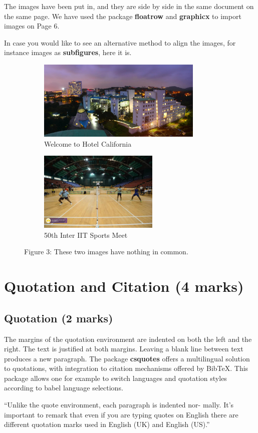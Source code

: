 \documentclass[english,12pt]{article}
\begin{document}
The images have been put in, and they are side by side in the same document
on the same page. We have used the package \textbf{floatrow} and \textbf{graphicx} to import
images on Page 6.\par
In case you would like to see an alternative method to align the images, for
instance images as \textbf{subfigures}, here it is.
\begin{figure}[H]
    \hspace{1cm}
    \begin{subfigure}{.4\textwidth}
        \includegraphics[width=\linewidth, height=1.5in]{3}
        \caption{\normalsize Welcome to Hotel California}
    \end{subfigure}\hspace{1.5cm}
    \begin{subfigure}{.4\textwidth}
        \includegraphics[width=\linewidth, height=1.5in]{4}
        \caption{\normalsize 50th Inter IIT Sports Meet}
    \end{subfigure}
    \caption*{Figure 3: These two images have nothing in common.}
\end{figure}
\newpage
\section{Quotation and Citation (4 marks)}
\subsection{Quotation (2 marks)}
The margins of the quotation environment are indented on both the left and the
right. The text is justified at both margins. Leaving a blank line between text
produces a new paragraph. The package \textbf{csquotes} offers a multilingual solution to quotations, with integration to citation mechanisms offered by BibTeX.
This package allows one for example to switch languages and quotation styles
according to babel language selections.\newline
\begin{displayquote}
“Unlike the quote environment, each paragraph is indented nor- mally.
It’s important to remark that even if you are typing quotes on English
there are different quotation marks used in English (UK) and English
(US).”
\end{displayquote}
\end{document}
